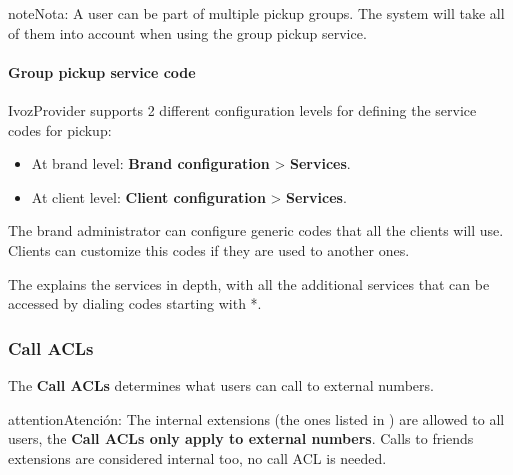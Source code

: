 \documentclass[letterpaper,10pt,spanish]{sphinxmanual}
\begin{document}
\begin{notice}{note}{Nota:}
A user can be part of multiple pickup groups. The system will take
all of them into account when using the group pickup service.
\end{notice}


\paragraph{Group pickup service code}
\label{administration_portal/client/vpbx/user_configuration/pick_up_groups:group-pickup-service-code}
IvozProvider supports 2 different configuration levels for defining the service
codes for pickup:
\begin{itemize}
\item {} 
At brand level: \textbf{Brand configuration} \textgreater{} \textbf{Services}.

\item {} 
At client level: \textbf{Client configuration} \textgreater{} \textbf{Services}.

\end{itemize}

The brand administrator can configure generic codes that all the clients will
use. Clients can customize this codes if they are used to another ones.

The {\hyperref[administration_portal/platform/services:services]{}} explains the services in depth, with
all the additional services that can be accessed by dialing codes starting with
*.


\subsubsection{Call ACLs}
\label{administration_portal/client/vpbx/user_configuration/call_acls:call-permissions}\label{administration_portal/client/vpbx/user_configuration/call_acls::doc}\label{administration_portal/client/vpbx/user_configuration/call_acls:call-acls}
The \textbf{Call ACLs} determines what users can call to external numbers.

\begin{notice}{attention}{Atención:}
The internal extensions (the ones listed in {\hyperref[administration_portal/client/vpbx/extensions:extensions]{}}) are allowed to all users, the \textbf{Call
ACLs only apply to external numbers}. Calls to friends extensions are considered internal too, no call ACL is needed.
\end{notice}
\end{document}
